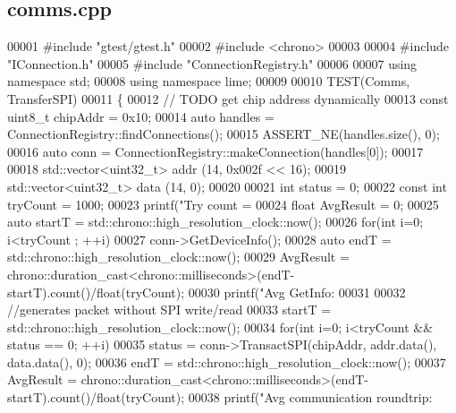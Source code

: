\subsection{comms.\+cpp}
\label{comms_8cpp_source}

\begin{DoxyCode}
00001 \textcolor{preprocessor}{#include "gtest/gtest.h"}
00002 \textcolor{preprocessor}{#include <chrono>}
00003 
00004 \textcolor{preprocessor}{#include "IConnection.h"}
00005 \textcolor{preprocessor}{#include "ConnectionRegistry.h"}
00006 
00007 \textcolor{keyword}{using namespace }std;
00008 \textcolor{keyword}{using namespace }lime;
00009 
00010 TEST(Comms, TransferSPI)
00011 \{
00012     \textcolor{comment}{// TODO get chip address dynamically}
00013     \textcolor{keyword}{const} uint8\_t chipAddr = 0x10;
00014     \textcolor{keyword}{auto} handles = ConnectionRegistry::findConnections();
00015     ASSERT\_NE(handles.size(), 0);
00016     \textcolor{keyword}{auto} conn = ConnectionRegistry::makeConnection(handles[0]);
00017 
00018     std::vector<uint32\_t> addr (14, 0x002f << 16);
00019     std::vector<uint32\_t> data (14, 0);
00020 
00021     \textcolor{keywordtype}{int} status = 0;
00022     \textcolor{keyword}{const} \textcolor{keywordtype}{int} tryCount = 1000;
00023     printf(\textcolor{stringliteral}{"Try count = %
00024     \textcolor{keywordtype}{float} AvgResult = 0;
00025     \textcolor{keyword}{auto} startT = std::chrono::high\_resolution\_clock::now();
00026     \textcolor{keywordflow}{for}(\textcolor{keywordtype}{int} i=0; i<tryCount ; ++i)
00027         conn->GetDeviceInfo();
00028     \textcolor{keyword}{auto} endT = std::chrono::high\_resolution\_clock::now();
00029     AvgResult = chrono::duration\_cast<chrono::milliseconds>(endT-startT).count()/float(tryCount);
00030     printf(\textcolor{stringliteral}{"Avg GetInfo: %
00031 
00032     \textcolor{comment}{//generates packet without SPI write/read}
00033     startT = std::chrono::high\_resolution\_clock::now();
00034     \textcolor{keywordflow}{for}(\textcolor{keywordtype}{int} i=0; i<tryCount && status == 0; ++i)
00035         status = conn->TransactSPI(chipAddr, addr.data(), data.data(), 0);
00036     endT = std::chrono::high\_resolution\_clock::now();
00037     AvgResult = chrono::duration\_cast<chrono::milliseconds>(endT-startT).count()/float(tryCount);
00038     printf(\textcolor{stringliteral}{"Avg communication roundtrip: %
}}}
\end{DoxyCode}
